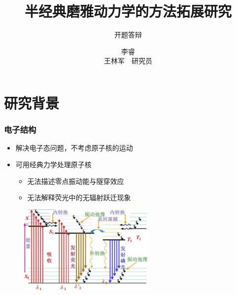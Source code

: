 \documentclass{beamer}
\title{\bfseries 半经典磨雅动力学的方法拓展研究}
\subtitle{开题答辩}
\author{李睿 \\ 王林军~~研究员}
\begin{document}
\begin{frame}[t]\frametitle{}
    
\maketitle

\end{frame}

\section{研究背景}
\begin{frame}[t]\frametitle{电子结构}
   
\begin{itemize}
 \item 解决电子态问题，不考虑原子核的运动
 \item 可用经典力学处理原子核
 \begin{itemize}
 	\item 无法描述零点振动能与隧穿效应
 	\item 无法解释荧光中的无辐射跃迁现象
 \end{itemize}
\end{itemize}

\begin{figure}
\includegraphics[width=0.6\textwidth]{fluoresence.jpg}
\end{figure}
\end{frame}
\end{document}
